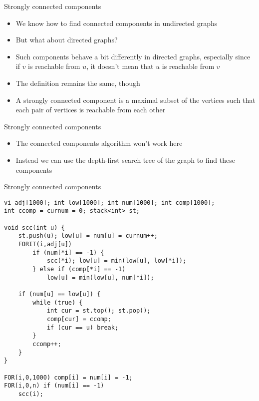 \documentclass[12pt,t]{beamer}
\newcommand{\bi}{\begin{itemize}}
\newcommand{\ei}{\end{itemize}}
\begin{document}
\begin{frame}{Strongly connected components}
    \vspace{10pt}
    \bi
        \item We know how to find connected components in undirected graphs
        \item But what about directed graphs?
        \vspace{10pt}
        \item Such components behave a bit differently in directed graphs, especially since if $v$ is reachable from $u$, it doesn't mean that $u$ is reachable from $v$
        \vspace{10pt}
        \item The definition remains the same, though
        \item A strongly connected component is a maximal subset of the vertices such that each pair of vertices is reachable from each other
    \ei
\end{frame}

\begin{frame}{Strongly connected components}
    \vspace{40pt}
    \bi
        \item The connected components algorithm won't work here
        \vspace{10pt}
        \item Instead we can use the depth-first search tree of the graph to find these components
    \ei
\end{frame}

\begin{frame}[fragile]{Strongly connected components}
\scriptsize
    \begin{verbatim}
vi adj[1000]; int low[1000]; int num[1000]; int comp[1000];
int ccomp = curnum = 0; stack<int> st;

void scc(int u) {
    st.push(u); low[u] = num[u] = curnum++;
    FORIT(i,adj[u])
        if (num[*i] == -1) {
            scc(*i); low[u] = min(low[u], low[*i]);
        } else if (comp[*i] == -1)
            low[u] = min(low[u], num[*i]);

    if (num[u] == low[u]) {
        while (true) {
            int cur = st.top(); st.pop();
            comp[cur] = ccomp;
            if (cur == u) break;
        }
        ccomp++;
    }
}

FOR(i,0,1000) comp[i] = num[i] = -1;
FOR(i,0,n) if (num[i] == -1)
    scc(i);
    \end{verbatim}
\end{frame}
\end{document}
